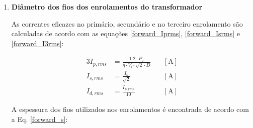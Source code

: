 \begin{apendicesenv}
\begin{enumerate}


\item \textbf{Diâmetro dos fios dos enrolamentos do transformador}
    
As correntes eficazes no primário, secundário e no terceiro enrolamento são calculadas de acordo com as equações \ref{forward_Iprms}, \ref{forward_Isrms} e \ref{forward_I3rms}: 
    
    \begin{alignat}{3}
        I_{p,rms} & = \frac{1.2 \cdot P_{o}}{\eta \cdot V_{i} \cdot \sqrt{2} \cdot D} \quad & [\text{A}]
        \label{forward_Isrms}\\
        I_{s,rms} & = \frac{I_{o}}{\sqrt{2}} \quad & [\text{A}]
        \label{forward_Iprms}\\
        I_{d,rms} & = \frac{I_{p,rms}}{10} \quad & [\text{A}]
        \label{forward_I3rms}
    \end{alignat}
    


    
A espessura dos fios utilizados nos enrolamentos é encontrada de acordo com a Eq. \ref{forward_s}:


\end{enumerate}
\end{apendicesenv}
